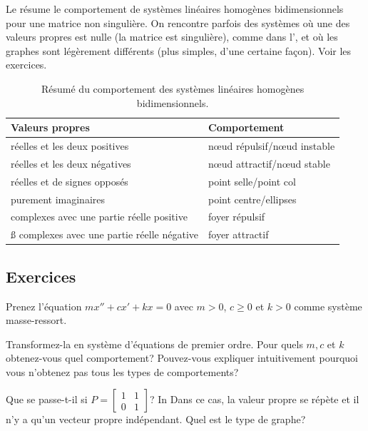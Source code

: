 \medskip

Le  résume le comportement de systèmes linéaires homogènes bidimensionnels pour une matrice non singulière. On rencontre parfois des systèmes où une des valeurs propres est nulle (la matrice est singulière), comme dans l', et où les graphes sont légèrement différents (plus simples, d'une certaine façon). Voir les exercices.

\begin{table}[h!t]
\mybeginframe
\capstart
\begin{center}
\begin{tabular}{@{}ll@{}}
\toprule
Valeurs propres & Comportement \\
\midrule
réelles et les deux positives & nœud répulsif/nœud instable \\
réelles et les deux négatives & nœud attractif/nœud stable \\
réelles et de signes opposés & point selle/point col \\
purement imaginaires & point centre/ellipses \\
complexes avec une partie réelle positive & foyer répulsif \\ß
complexes avec une partie réelle négative & foyer attractif \\
\bottomrule
\end{tabular}
\end{center}
\caption{Résumé du comportement des systèmes linéaires homogènes bidimensionnels.\label{pln:behtab}}
\myendframe
\end{table}

\subsection{Exercices}

\begin{exercise}
Prenez l'équation $m x'' + c x' + kx = 0$ avec $m > 0$, $c \geq 0$ et $k > 0$
comme système masse-ressort.
\begin{tasks}
\task Transformez-la en système d'équations de premier ordre.
\task Pour quels $m, c$ et $k$ obtenez-vous quel comportement?
\task Pouvez-vous expliquer intuitivement pourquoi vous n'obtenez pas tous les types de comportements?
\end{tasks}
\end{exercise}

\begin{exercise}
Que se passe-t-il si $P = 
\left[ \begin{smallmatrix} 1 & 1 \\ 0 & 1 \end{smallmatrix} \right]$? In
Dans ce cas, la valeur propre se répète et il n'y a qu'un vecteur propre indépendant.
Quel est le type de graphe?
\end{exercise}

